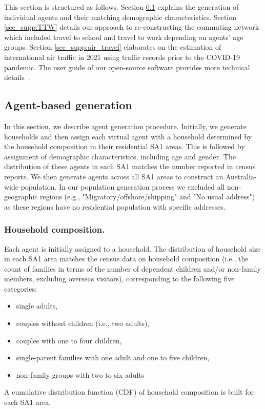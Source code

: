 \documentclass{article}
\begin{document}
\begin{appendices}

This section is structured as follows. Section \ref{sec_supp:agent_gene} explains the generation of individual agents and their matching demographic characteristics. Section \ref{sec_supp:TTW} details our approach to re-constructing the commuting network which included travel to school and travel to work depending on agents' age groups. Section \ref{sec_supp:air_travel} elaborates on the estimation of international air traffic in 2021 using traffic records prior to the COVID-19 pandemic. The user guide of our open-source software provides more technical details~\cite{chang_amtract_user_guide_2022_7325675}.


\subsection{Agent-based generation}
\label{sec_supp:agent_gene}
In this section, we describe agent generation procedure. Initially, we generate households and then assign each virtual agent with a household determined by the household composition in their residential SA1 areas. This is followed by assignment of demographic characteristics, including age and gender. The distribution of these agents in each SA1 matches the number reported  in census reports. We then generate agents across all SA1 areas to construct an Australia-wide population. In our population generation process  we excluded all non-geographic regions (e.g., "Migratory/offshore/shipping" and "No usual address") as these regions have no residential population with specific addresses. 



\subsubsection{Household composition.}

Each agent is initially assigned to a household. The distribution of household size in each SA1 area matches the census data on household composition (i.e., the count of families in terms of the number of dependent children and/or non-family members, excluding overseas visitors), corresponding to the following five categories:
\begin{itemize}
    \item single adults, 
    \item couples without children (i.e., two adults), 
    \item couples with  one to four children,
    \item single-parent families with one adult and  one to five children, 
    \item non-family groups with two to six adults
\end{itemize}
 A cumulative distribution function (CDF)  of household composition is built for each SA1 area.  


\end{appendices}
\end{document}

